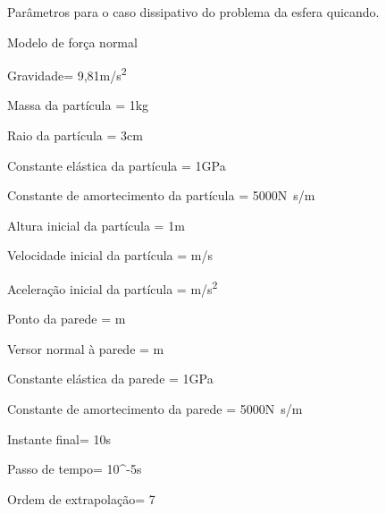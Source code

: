\begin{table}[h]
\centering
\caption{Parâmetros para o caso dissipativo do problema da esfera quicando.}
\label{tab:bouncing_sphere:dissipative_case:parameters}
\begin{parametersdesc}
	\item{Modelo de força normal}{}{\emptyUnit}
	\item{Gravidade}{\gravityScalar = 9,81}{\si[per-mode=symbol]{\metre\per\square\second}}
	\hline
	\item{Massa da partícula}{\ind{\mass}{\particle} = 1}{\si\kilogram}
	\item{Raio da partícula}{\ind{\radius}{\particle} = 3}{\si\centi\metre}
	\item{Constante elástica da partícula}{\ind{\elasticModulus}{\particle} = 1}{\si[per-mode=symbol]{\giga\pascal}}
	\item{Constante de amortecimento da partícula}{\ind{\normalDampingConstant}{\particle} = \SI{5000}{}}{\si[per-mode=symbol]{\newton\second\per\meter}}
	\hline
	\item{Altura inicial da partícula}{\initial{\positiony} = 1}{\si{\metre}}
	\item{Velocidade inicial da partícula}{\explicitVector{\initial{\velocityx}}{\initial{\velocityy}}{\initial{\velocityz}} = }{\si[per-mode=symbol]{\metre\per\second}}
	\item{Aceleração inicial da partícula}{\explicitVector{\initial{\accelerationx}}{\initial{\accelerationy}}{\initial{\accelerationz}} = }{\si[per-mode=symbol]{\metre\per\square\second}}
	\hline
	\item{Ponto da parede}{\ind{\planeOrigin}{\element} = }{\si\meter}
	\item{Versor normal à parede}{\ind{\planeNormalVersor}{\element} = }{\si\metre}
	\item{Constante elástica da parede}{\ind{\elasticModulus}{\element} = 1}{\si[per-mode=symbol]{\giga\pascal}}
	\item{Constante de amortecimento da parede}{\ind{\normalDampingConstant}{\element} = \SI{5000}{}}{\si[per-mode=symbol]{\newton\second\per\meter}}
	\hline
	\item{Instante final}{\finalInstant = 10}{\si\second} 
	\item{Passo de tempo}{\Dt = 10^{-5}}{\si\second}
	\item{Ordem de extrapolação}{\taylorOrder = 7}{\emptyUnit}
\end{parametersdesc}
\sourceMe 
\end{table}

